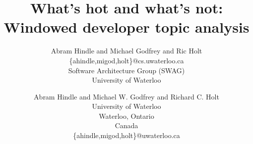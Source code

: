 \documentclass[times, 10pt,twocolumn]{article}
\author{Abram Hindle and Michael Godfrey and Ric Holt \\
\{ahindle,migod,holt\}@cs.uwaterloo.ca\\
Software Architecture Group (SWAG)\\
University of Waterloo\\
}
\title{What's hot and what's not:\\Windowed developer topic analysis}
\begin{document}
\newcommand{\affaddr}[1]{#1}
\newcommand{\aemail}[1]{#1}
\author{
Abram Hindle and Michael W. Godfrey and Richard C. Holt\\
\affaddr{University of Waterloo}\\
\affaddr{Waterloo, Ontario}\\
\affaddr{Canada}\\
\aemail{\{ahindle,migod,holt\}@uwaterloo.ca}
}






\maketitle
\thispagestyle{empty}
\end{document}
